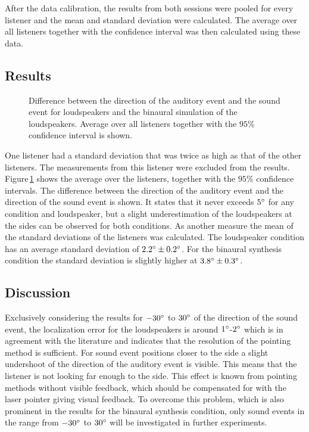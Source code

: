 After the data calibration, the results from both sessions were pooled for every
listener and the mean and standard deviation were calculated. The average over all
listeners together with the confidence interval\autocite{Cumming2007} was then
calculated using these data.

\subsection{Results}
\label{sec:results_binaural_localization}
%
\begin{figure}
    \small
    \centering
    
    \caption{Difference between the direction of the auditory event and the
    sound event for loudspeakers and the binaural simulation of the
    loudspeakers. Average over all listeners together with the $95\%$ confidence
    interval is shown.
    }
    \label{fig:binaural_synthesis_localization}
\end{figure}
%
\noindent One listener had a standard deviation that was twice as high as that of
the other listeners. The measurements from this listener
were excluded from the results.
Figure\,\ref{fig:binaural_synthesis_localization} shows the average over the listeners,
together with the $95\%$
confidence intervals.
The difference between the direction of the auditory event and the direction of
the sound event is shown.
It states that it never exceeds $5^\circ$ for any condition and
loudspeaker, but a slight underestimation
of the loudspeakers at the sides can be observed for both conditions.
As another measure the mean of the standard deviations of the listeners was calculated.
The loudspeaker condition has an average standard deviation of 
$2.2^\circ \pm 0.2^\circ$. For the binaural synthesis  condition the standard
deviation is slightly higher at $3.8^\circ \pm 0.3^\circ$.

\subsection{Discussion}
%
Exclusively considering the results for $-30^\circ$ to $30^\circ$ of the direction
of the sound event, the localization error for the loudspeakers
is around $1^\circ$-$2^\circ$ which is in agreement with the literature and
indicates that the resolution of the pointing method is sufficient. For sound
event positions closer to the side a slight undershoot of the direction of the
auditory event is visible. This means that the listener is not looking far enough
to the side. This effect is known from pointing methods without visible
feedback, which should be compensated for with the laser pointer giving visual
feedback. To overcome this problem, which is also prominent in the results for
the binaural synthesis condition, only sound events in the range from
$-30^\circ$ to $30^\circ$ will be investigated in further experiments.

